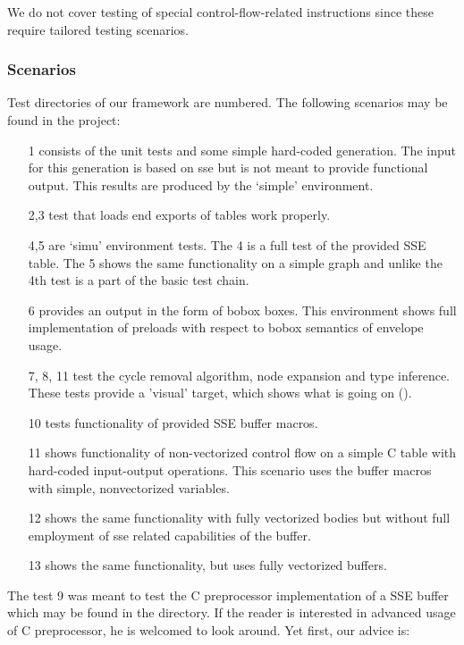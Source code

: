 We do not cover testing of special control-flow-related instructions since these require tailored testing scenarios.


\subsubsection{Scenarios}

Test directories of our framework are numbered. The following scenarios may be found in the project:

\begin{enumerate}
  \item[1] consists of the unit tests and some simple hard-coded generation. The input for this generation is based on sse but is not meant to provide functional output. This results are produced by the `simple' environment.
  \item[2,3] test that loads end exports of tables work properly.
  \item[4,5] are `simu' environment tests. The 4 is a full test of the provided SSE table. The 5 shows the same functionality on a simple graph and unlike the 4th test is a part of the basic test chain.
  \item[6] provides an output in the form of bobox boxes. This environment shows full implementation of preloads with respect to bobox semantics of envelope usage.
  \item[7, 8, 11] test the cycle removal algorithm, node expansion and type inference. These tests provide a 'visual' target, which shows what is going on ().
  \item[10] tests functionality of provided SSE buffer macros.
  \item[11] shows functionality of non-vectorized control flow on a simple C table with hard-coded input-output operations. This scenario uses the buffer macros with simple, nonvectorized variables.
  \item[12] shows the same functionality with fully vectorized bodies but without full employment of sse related capabilities of the buffer.
  \item[13] shows the same functionality, but uses fully vectorized buffers.
\end{enumerate}

The test 9 was meant to test the C preprocessor implementation of a SSE buffer which may be found in the  directory. If the reader is interested in advanced usage of C preprocessor, he is welcomed to look around. Yet first, our advice is:


